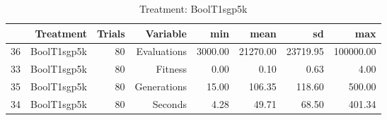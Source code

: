 \begin{table}[ht]
\centering
\begin{tabular}{rrrrrrrr}
  \hline
 & Treatment & Trials & Variable & min & mean & sd & max \\ 
  \hline
36 & BoolT1sgp5k &  80 & Evaluations & 3000.00 & 21270.00 & 23719.95 & 100000.00 \\ 
  33 & BoolT1sgp5k &  80 & Fitness & 0.00 & 0.10 & 0.63 & 4.00 \\ 
  35 & BoolT1sgp5k &  80 & Generations & 15.00 & 106.35 & 118.60 & 500.00 \\ 
  34 & BoolT1sgp5k &  80 & Seconds & 4.28 & 49.71 & 68.50 & 401.34 \\ 
   \hline
\end{tabular}
\caption{Treatment: BoolT1sgp5k} 
\end{table}
